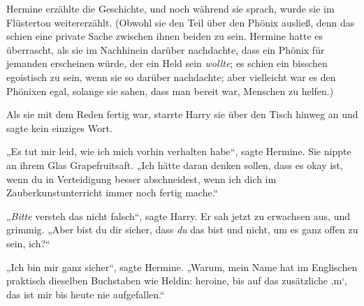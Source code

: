 Hermine erzählte die Geschichte, und noch während sie sprach, wurde sie im Flüsterton weitererzählt. (Obwohl sie den Teil über den Phönix ausließ, denn das schien eine private Sache zwischen ihnen beiden zu sein. Hermine hatte es überrascht, als sie im Nachhinein darüber nachdachte, dass ein Phönix für jemanden erscheinen würde, der ein Held sein \emph{wollte}; es schien ein bisschen egoistisch zu sein, wenn sie so darüber nachdachte; aber vielleicht war es den Phönixen egal, solange sie sahen, dass man bereit war, Menschen zu helfen.)

Als sie mit dem Reden fertig war, starrte Harry sie über den Tisch hinweg an und sagte kein einziges Wort.

„Es tut mir leid, wie ich mich vorhin verhalten habe“, sagte Hermine. Sie nippte an ihrem Glas Grapefruitsaft.
„Ich hätte daran denken sollen, dass es okay ist, wenn du in Verteidigung besser abschneidest, wenn ich dich im Zauberkunstunterricht immer noch fertig mache.“

„\emph{Bitte} versteh das nicht falsch“, sagte Harry. Er sah jetzt zu erwachsen aus, und grimmig.
„Aber bist du dir sicher, dass \emph{du} das bist und nicht, um es ganz offen zu sein, ich?“

„Ich bin mir ganz sicher“, sagte Hermine.
„Warum, mein Name hat im Englischen praktisch dieselben Buchstaben wie Heldin: heroine, bis auf das zusätzliche ‚m‘, das ist mir bis heute nie aufgefallen.“

